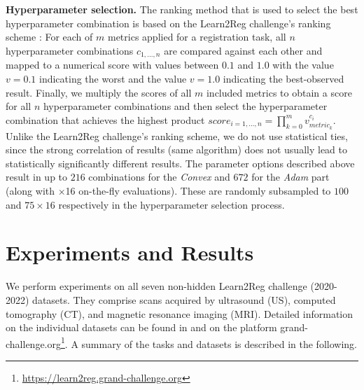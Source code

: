 \\\\
\noindent \textbf{Hyperparameter selection.} The ranking method that is used to select the best hyperparameter combination is based on the Learn2Reg challenge's ranking scheme \citep{hering2022learn2reg}: For each of $m$ metrics applied for a registration task, all $n$ hyperparameter combinations $c_{1,...,n}$ are compared against each other and mapped to a numerical score with values between $0.1$ and $1.0$ with the value $v = 0.1$ indicating the worst and the value $v = 1.0$ indicating the best-observed result. Finally, we multiply the scores of all $m$ included metrics to obtain a score for all $n$ hyperparameter combinations and then select the hyperparameter combination that achieves the highest product $score_{i=1,...,n} = \prod_{k=0}^{m} v_{metric_k}^{c_i}$. Unlike the Learn2Reg challenge's ranking scheme, we do not use statistical ties, since the strong correlation of results (same algorithm) does not usually lead to statistically significantly different results. The parameter options described above result in up to $216$ combinations for the \emph{Convex} and $672$ for the \emph{Adam} part (along with $\times$16 on-the-fly evaluations). These are randomly subsampled to $100$ and $75\times16$ respectively in the hyperparameter selection process.

\section{Experiments and Results}
We perform experiments on all seven non-hidden Learn2Reg challenge (2020-2022) datasets. They comprise scans acquired by ultrasound (US), computed tomography (CT), and magnetic resonance imaging (MRI). Detailed information on the individual datasets can be found in \citep{hering2022learn2reg} and on the platform grand-challenge.org\footnote{\href{https://learn2reg.grand-challenge.org}{https://learn2reg.grand-challenge.org}}. A summary of the tasks and datasets is described in the following.

